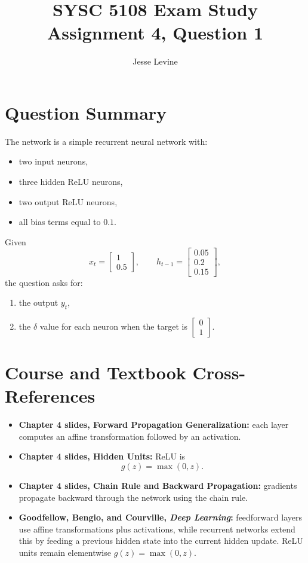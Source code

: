 \documentclass[11pt]{article}
\title{SYSC 5108 Exam Study\\Assignment 4, Question 1}
\author{Jesse Levine}
\date{}
\begin{document}
\maketitle

\section*{Question Summary}

The network is a simple recurrent neural network with:
\begin{itemize}
    \item two input neurons,
    \item three hidden ReLU neurons,
    \item two output ReLU neurons,
    \item all bias terms equal to \(0.1\).
\end{itemize}

Given
\[
    x_t = \begin{bmatrix}1 \\ 0.5\end{bmatrix},
    \qquad
    h_{t-1} = \begin{bmatrix}0.05 \\ 0.2 \\ 0.15\end{bmatrix},
\]
the question asks for:
\begin{enumerate}[label=(\alph*)]
    \item the output \(y_t\),
    \item the \(\delta\) value for each neuron when the target is
    \(\begin{bmatrix}0 \\ 1\end{bmatrix}\).
\end{enumerate}

\section*{Course and Textbook Cross-References}

\begin{itemize}
    \item \textbf{Chapter 4 slides, Forward Propagation Generalization:} each
    layer computes an affine transformation followed by an activation.
    \item \textbf{Chapter 4 slides, Hidden Units:} ReLU is
    \[
        g(z)=\max(0,z).
    \]
    \item \textbf{Chapter 4 slides, Chain Rule and Backward Propagation:}
    gradients propagate backward through the network using the chain rule.
    \item \textbf{Goodfellow, Bengio, and Courville, \emph{Deep Learning}:}
    feedforward layers use affine transformations plus activations, while recurrent
    networks extend this by feeding a previous hidden state into the current hidden
    update. ReLU units remain elementwise \(g(z)=\max(0,z)\).
\end{itemize}
\end{document}
